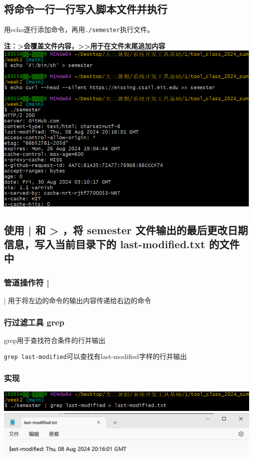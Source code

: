 \documentclass[UTF8,a4paper]{ctexart}
\begin{document}
\subsection{将命令一行一行写入脚本文件并执行}
用echo逐行添加命令，再用\verb|./semester|执行文件。\par
\textbf{注：>会覆盖文件内容，>>用于在文件末尾追加内容}\\
\includegraphics[width=1\textwidth]{./pictures/3.png}

\subsection{使用 | 和 > ，将 semester 文件输出的最后更改日期信息，写入当前目录下的 last-modified.txt 的文件中}
\subsubsection{管道操作符 |}
| 用于将左边的命令的输出内容传递给右边的命令
\subsubsection{行过滤工具 grep}
grep用于查找符合条件的行并输出\par
\verb|grep last-modified|\quad 可以查找有last-modified字样的行并输出
\subsubsection{实现}
\begin{center}
\includegraphics[width=1\textwidth]{./pictures/4.1.png}\\
\includegraphics[width=1\textwidth]{./pictures/4.2.png}
\end{center}
\end{document}
